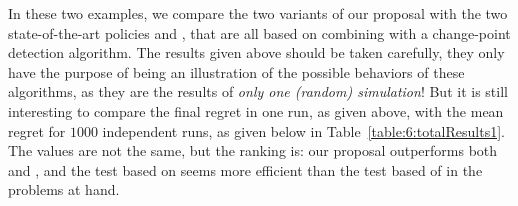 

In these two examples, we compare the two variants of our proposal with the two state-of-the-art policies \CUSUMklUCB{} and \MklUCB,
that are all based on combining \klUCB{} with a change-point detection algorithm.
The results given above should be taken carefully, they only have the purpose of being an illustration of the possible behaviors of these algorithms, as they are the results of \emph{only one (random) simulation}!
But it is still interesting to compare the final regret in one run, as given above, with the mean regret for $1000$ independent runs, as given below in Table~\ref{table:6:totalResults1}.
The values are not the same, but the ranking is: our proposal outperforms both \CUSUMklUCB{} and \MklUCB, and the test based on \CUSUM{} seems more efficient than the test based of \MklUCB{} in the problems at hand.


